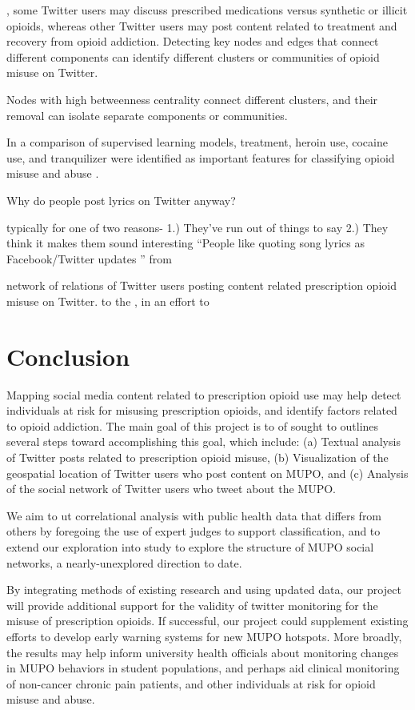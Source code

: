 \documentclass[sigconf]{acmart}
\begin{document}
, some Twitter users may discuss 
prescribed medications versus synthetic or illicit opioids, whereas other 
Twitter users may post content related to treatment and recovery from opioid 
addiction. Detecting key nodes and edges that connect different components 
can identify different clusters or communities of opioid misuse on Twitter.



Nodes with high 
betweenness centrality connect different clusters, and their removal can
isolate separate components or communities. 

In a comparison of supervised 
learning models, treatment, heroin use, cocaine use, and tranquilizer were 
identified as important features for classifying opioid misuse and abuse 
\cite{shiverick17}. 
 
 
Why do people post lyrics on Twitter anyway? 


typically for one of two reasons- 1.) They’ve run out of things to say 
2.) They think it makes them sound interesting
“People like quoting song lyrics as Facebook/Twitter updates ” from 


 network of relations of Twitter users posting 
content related prescription opioid misuse on Twitter. 
to the , in an effort to  

\section{Conclusion}

Mapping social 
media content related to prescription opioid use may help detect individuals 
at risk for misusing prescription opioids, and identify factors related to 
opioid addiction. The main goal of this project is to 
of 
sought to  outlines several steps 
toward accomplishing this goal, which include: (a) Textual analysis of Twitter 
posts related to prescription opioid misuse, (b) Visualization of the 
geospatial location of Twitter users who post content on MUPO, and (c) Analysis 
of the social network of Twitter users who tweet about the MUPO. 


We aim to ut correlational analysis with 
public health data that differs from others by foregoing the use of expert 
judges to support classification, and to extend our exploration into study to 
explore the structure of MUPO social networks, a nearly-unexplored direction 
to date. 

By integrating methods of existing research and using updated data, our project
will provide additional support for the validity of twitter monitoring for the
misuse of prescription opioids. If successful, our project could supplement 
existing efforts to develop early warning systems for new MUPO hotspots. More 
broadly, the results may help inform university health officials about
monitoring changes in MUPO behaviors in student populations, and perhaps aid 
clinical monitoring of non-cancer chronic pain patients, and other individuals 
at risk for opioid misuse and abuse. 
\end{document}
